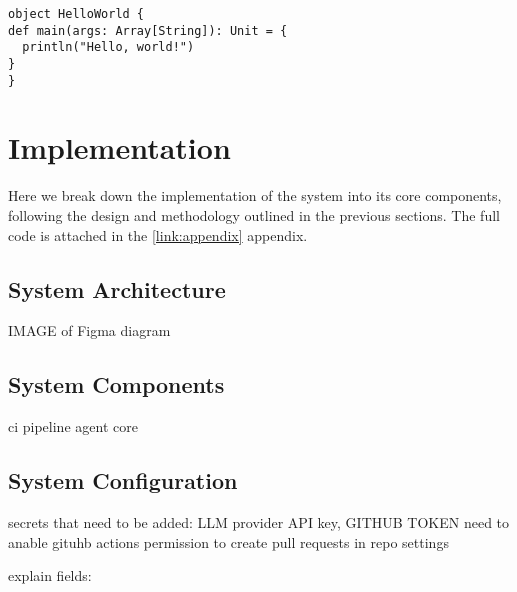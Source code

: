 

\begin{lstlisting}[caption={Ein Beispiel: Hello World (Scala)}]
object HelloWorld {
def main(args: Array[String]): Unit = {
  println("Hello, world!")
}
}
\end{lstlisting}

\section{Implementation}
Here we break down the implementation of the system into its core components, following the design and methodology outlined in the previous sections. The full code is attached in the \ref{link:appendix} appendix.


\subsection{System Architecture}

IMAGE of Figma diagram

\subsection{System Components}

ci pipeline
agent core

\subsection{System Configuration}
secrets that need to be added:
LLM provider API key, GITHUB TOKEN
need to anable gituhb actions permission to create pull requests in repo settings

explain fields: